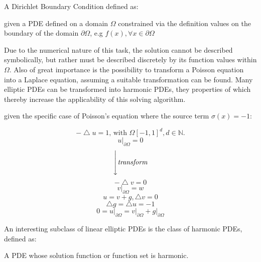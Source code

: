 A Dirichlet Boundary Condition defined as:
\begin{definition}
given a \Gls{PDE}
defined on a domain $\Omega$ constrained via the definition values on the
 boundary of the domain $\partial \Omega$, e.g $f(x), \forall  x \in \partial \Omega$
\end{definition}
Due to the numerical nature of this task, the solution cannot be described symbolically,
but rather must be described discretely by its function values within $\Omega$.
Also of great importance is the possibility to transform a Poisson equation into
a Laplace equation, assuming a suitable transformation can be found.   Many elliptic \glspl{PDE} can be transformed into harmonic \glspl{PDE},
they properties of which thereby increase the applicability of this solving algorithm\cite{Bornemann}.
\begin{example}
  given the specific case of Poisson's equation where the source term $\sigma(x)=-1$:
  \begin{multicols}{2}
    \begin{equation}
      -\bigtriangleup u = 1\text{, with }\Omega [-1,1]^{d}, d \in \mathbb{N}.
    \end{equation}
      $$u\big\rvert_{\partial \Omega} = 0 $$
    \begin{equation}
      \Bigg\downarrow \textit{transform}
    \end{equation}
    \begin{equation}
      -\bigtriangleup v = 0
    \end{equation}
    $$v\big\rvert_{\partial \Omega} = w$$
    \break
    \begin{equation}
    u = v + g, \bigtriangleup v = 0
    \end{equation}
    \begin{equation}
      \bigtriangleup g = \bigtriangleup u = -1
    \end{equation}
        $$0 = u\big\rvert_{\partial \Omega} = v\big\rvert_{\partial \Omega} + g\big\rvert_{\partial \Omega}$$\break\break
  \end{multicols}
\cite{Bornemann}
\end{example}
An interesting subclass of linear elliptic \Glspl{PDE} is the class of harmonic \Glspl{PDE}, defined as:
\begin{definition}
  A \Gls{PDE} whose solution function or function set is harmonic.
\end{definition}

